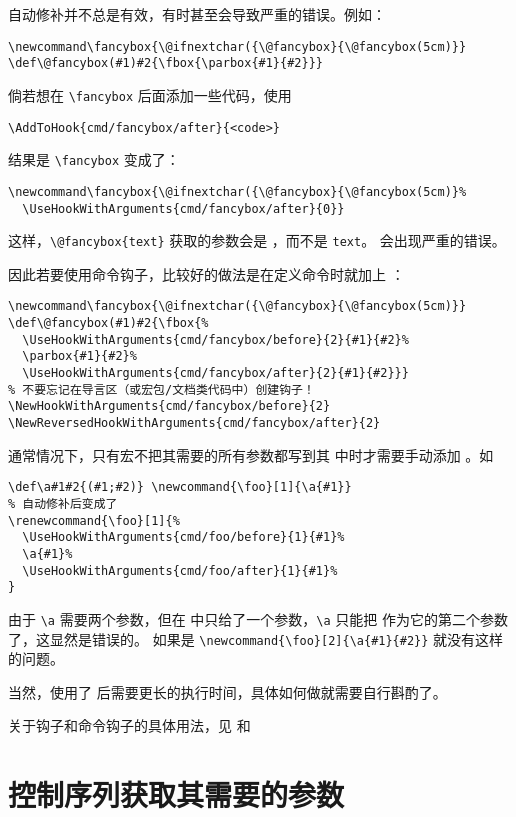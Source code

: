 \documentclass[openany]{book}
\begin{document}
自动修补并不总是有效，有时甚至会导致严重的错误。例如：
\begin{Verbatim}
\newcommand\fancybox{\@ifnextchar({\@fancybox}{\@fancybox(5cm)}}
\def\@fancybox(#1)#2{\fbox{\parbox{#1}{#2}}}
\end{Verbatim}
倘若想在 \verb|\fancybox| 后面添加一些代码，使用
\begin{Verbatim}
\AddToHook{cmd/fancybox/after}{<code>}
\end{Verbatim}
结果是 \verb|\fancybox| 变成了：
\begin{Verbatim}
\newcommand\fancybox{\@ifnextchar({\@fancybox}{\@fancybox(5cm)}%
  \UseHookWithArguments{cmd/fancybox/after}{0}}
\end{Verbatim}
这样，\verb|\@fancybox{text}| 获取的参数会是 ，而不是 \verb|text|。
会出现严重的错误。

因此若要使用命令钩子，比较好的做法是在定义命令时就加上 ：
\begin{Verbatim}
\newcommand\fancybox{\@ifnextchar({\@fancybox}{\@fancybox(5cm)}}
\def\@fancybox(#1)#2{\fbox{%
  \UseHookWithArguments{cmd/fancybox/before}{2}{#1}{#2}%
  \parbox{#1}{#2}%
  \UseHookWithArguments{cmd/fancybox/after}{2}{#1}{#2}}}
% 不要忘记在导言区（或宏包/文档类代码中）创建钩子！
\NewHookWithArguments{cmd/fancybox/before}{2}
\NewReversedHookWithArguments{cmd/fancybox/after}{2}
\end{Verbatim}

通常情况下，只有宏不把其需要的所有参数都写到其  中时才需要手动添加 。如
\begin{Verbatim}
\def\a#1#2{(#1;#2)} \newcommand{\foo}[1]{\a{#1}}
% 自动修补后变成了
\renewcommand{\foo}[1]{%
  \UseHookWithArguments{cmd/foo/before}{1}{#1}%
  \a{#1}%
  \UseHookWithArguments{cmd/foo/after}{1}{#1}%
}
\end{Verbatim}
由于 \verb|\a| 需要两个参数，但在  中只给了一个参数，\verb|\a| 只能把  作为它的第二个参数了，这显然是错误的。
如果是 \verb|\newcommand{\foo}[2]{\a{#1}{#2}}| 就没有这样的问题。

当然，使用了  后需要更长的执行时间，具体如何做就需要自行斟酌了。

关于钩子和命令钩子的具体用法，见  和 

\section{控制序列获取其需要的参数}
\end{document}
